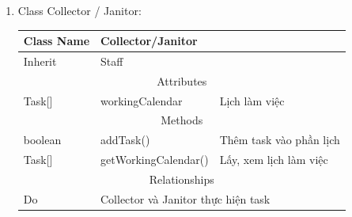 \begin{enumerate}
        \item Class Collector / Janitor:
        \begin{table}[htp]
            \begin{tabular}{|lll|}
                \hline
                \multicolumn{1}{|l|}{Class Name} & \multicolumn{2}{l|}{Collector/Janitor}                              \\ \hline
                \multicolumn{1}{|l|}{Inherit}    & \multicolumn{2}{l|}{Staff}                                          \\ \hline
                \multicolumn{3}{|c|}{\cellcolor[HTML]{FFFFC7}Attributes}                                               \\ \hline
                \multicolumn{1}{|l|}{Task{[}{]}} & \multicolumn{1}{l|}{workingCalendar}      & Lịch làm việc           \\ \hline
                \multicolumn{3}{|c|}{\cellcolor[HTML]{FFFFC7}Methods}                                                  \\ \hline
                \multicolumn{1}{|l|}{boolean}    & \multicolumn{1}{l|}{addTask()}            & Thêm task vào phần lịch \\ \hline
                \multicolumn{1}{|l|}{Task{[}{]}} & \multicolumn{1}{l|}{getWorkingCalendar()} & Lấy, xem lịch làm việc  \\ \hline
                \multicolumn{3}{|c|}{\cellcolor[HTML]{FFFFC7}Relationships}                                            \\ \hline
                \multicolumn{1}{|l|}{Do}         & \multicolumn{2}{l|}{Collector và Janitor thực hiện task}            \\ \hline
            \end{tabular}
        \end{table}
            

\end{enumerate}
